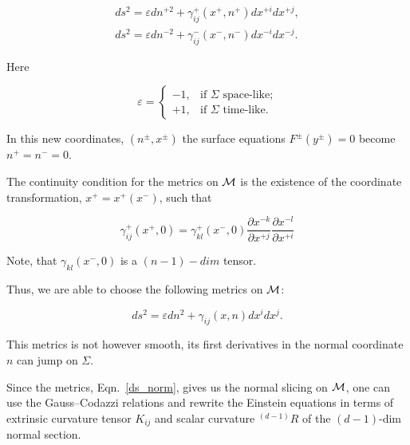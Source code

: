 \begin{gather}

ds^2 = \varepsilon dn^{+2} + \gamma_{ij}^+(x^+, n^+)dx^{+i}dx^{+j},

\\

ds^2 = \varepsilon dn^{-2} + \gamma_{ij}^-(x^-, n^-)dx^{-i}dx^{-j}.

\end{gather}

Here

$$

\varepsilon=\begin{cases}

-1,&\text{if $\Sigma$ space-like;}\\

+1,&\text{if $\Sigma$ time-like.}

\end{cases}

$$

In this new coordinates, $(n^{\pm},x^{\pm})$ the surface equations $F^{\pm}(y^{\pm})=0$ become ${n^+=n^-=0}$. 

The continuity condition for the metrics on ${\cal M}$ is the existence of the coordinate transformation, $x^+=x^+(x^-)$, such that

$$

\gamma_{ij}^+(x^+, 0) = \gamma_{kl}^+(x^-, 0)\frac{\partial x^{-k}}{\partial x^{+j}}\frac{\partial x^{-l}}{\partial x^{+i}}

$$

Note, that $\gamma_{kl}(x^-,0)$ is a $(n-1)-dim$ tensor. 

Thus, we are able to choose the following metrics on ${\cal M}$:

\begin{equation}

\label{ds_norm}

ds^2 = \varepsilon dn^{2} + \gamma_{ij}(x, n)dx^{i}dx^{j}.

\end{equation}

This metrics is not however smooth, its first derivatives in the normal coordinate $n$ can jump on $\Sigma$. 

Since the metrics, Eqn.~\eqref{ds_norm}, gives us the normal slicing on ${\cal M}$, one can use the Gauss--Codazzi relations and rewrite the Einstein equations in terms of extrinsic curvature tensor $K_{ij}$ and scalar curvature $ ^{(d-1)}R$ of the $(d-1)$-dim normal section. 

